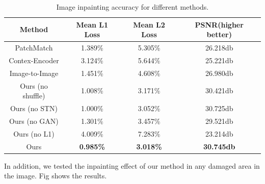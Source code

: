 \documentclass{IEEE_lsens}
\begin{document}
\begin{table}[!t]
  \caption{Image inpainting accuracy for different methods.}
  \centering
  \begin{tabular}{c|c|c|c}
    \hline
    \bf{Method}             &   \bf{Mean L1 Loss}     &   \bf{Mean L2 Loss}   &   \bf{PSNR}(higher better)   \\
    \hline
    \hline
    PatchMatch       	 &  1.389\%         &  5.305\%          &  26.218db              \\
    \hline
    Contex-Encoder       &  3.124\%         &  5.644\%          &  25.221db              \\
    \hline
    Image-to-Image       &  1.451\%         &  4.608\%          &  26.980db              \\
    \hline
    Ours (no shuffle)    &  1.008\%         &  3.171\%          &  30.421db              \\
    \hline
    Ours (no STN)        &  1.000\%         &  3.052\%          &  30.725db              \\
    \hline
    Ours (no GAN)        &  1.301\%         &  3.457\%          &  29.521db             \\
    \hline
    Ours (no L1)         &  4.009\%         &  7.283\%          &  23.214db             \\
    \hline
    Ours                 & \bf{0.985\%}     &  \bf{3.018\%}     &  \bf{30.745db}              \\
    \hline
  \end{tabular}
  \label{resultTable}
\end{table}
In addition, we tested the inpainting effect of our method in any damaged area in the image. Fig shows the results.
\end{document}
